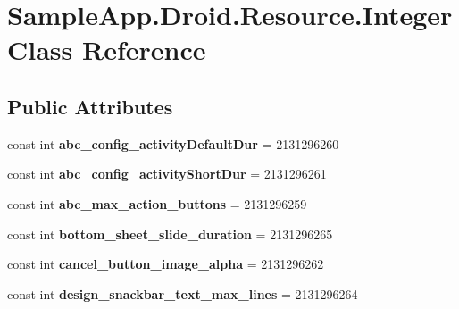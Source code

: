\hypertarget{class_sample_app_1_1_droid_1_1_resource_1_1_integer}{}\section{Sample\+App.\+Droid.\+Resource.\+Integer Class Reference}
\label{class_sample_app_1_1_droid_1_1_resource_1_1_integer}
\subsection*{Public Attributes}
\begin{DoxyCompactItemize}
\item 
\mbox{\label{class_sample_app_1_1_droid_1_1_resource_1_1_integer_adfbe52d57caa599094882b0e4bdb8bb9}} 
const int {\bfseries abc\+\_\+config\+\_\+activity\+Default\+Dur} = 2131296260
\item 
\mbox{\label{class_sample_app_1_1_droid_1_1_resource_1_1_integer_aba688d16dfb30c3a1811b2d4676c31e3}} 
const int {\bfseries abc\+\_\+config\+\_\+activity\+Short\+Dur} = 2131296261
\item 
\mbox{\label{class_sample_app_1_1_droid_1_1_resource_1_1_integer_ac8e3fc8a8beb2569ad0f6645abfc9eb1}} 
const int {\bfseries abc\+\_\+max\+\_\+action\+\_\+buttons} = 2131296259
\item 
\mbox{\label{class_sample_app_1_1_droid_1_1_resource_1_1_integer_a9f2f988bbc75fbcb11dde66f36d9bd24}} 
const int {\bfseries bottom\+\_\+sheet\+\_\+slide\+\_\+duration} = 2131296265
\item 
\mbox{\label{class_sample_app_1_1_droid_1_1_resource_1_1_integer_ad2e9ce120d24f139e09a091be1d391b8}} 
const int {\bfseries cancel\+\_\+button\+\_\+image\+\_\+alpha} = 2131296262
\item 
\mbox{\label{class_sample_app_1_1_droid_1_1_resource_1_1_integer_a6678541bd444bc4aa16c5641b303b4af}} 
const int {\bfseries design\+\_\+snackbar\+\_\+text\+\_\+max\+\_\+lines} = 2131296264

\end{DoxyCompactItemize}
